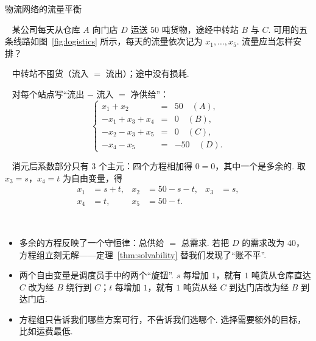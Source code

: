 \documentclass[lang=cn,10.5pt,scheme=chinese,toc=twocol,section,chinesefont=nofont,
twoside,citestyle=gb7714-2015,bibstyle=gb7714-2015]{elegantbook}
\DeclareRobustCommand{\textbf}[1]{{\lnsemiboldlatin\lnsemiboldcjk #1}}
\numberwithin{equation}{section}   %
\newcommand{\mstep}[1]{\par\smallskip\noindent\textbf{【#1】}\ }
\begin{document}
\begin{modelbox}{物流网络的流量平衡}
  \mstep{问题} 某公司每天从仓库 $A$ 向门店 $D$ 运送 $50$ 吨货物，途经中转站 $B$ 与 $C$. 可用的五条线路如图~\ref{fig:logistics} 所示，每天的流量依次记为 $x_1,\ldots,x_5$. 流量应当怎样安排？
  \begin{center}
    \label{fig:logistics}
  \end{center}
  \mstep{假设} 中转站不囤货（流入 $=$ 流出）；途中没有损耗.

  \mstep{模型} 对每个站点写“流出 $-$ 流入 $=$ 净供给”：
  \begin{equation}
    \label{eq:logistics}
    \left\{
           \begin{array}{rcl}
             x_1+x_2      & = & 50 \quad (A),  \\
             -x_1+x_3+x_4 & = & 0 \quad (B),   \\
             -x_2-x_3+x_5 & = & 0 \quad (C),   \\
             -x_4-x_5     & = & -50 \quad (D).
           \end{array}
    \right.
  \end{equation}

  \mstep{求解} 消元后系数部分只有 $3$ 个主元：四个方程相加得 $0=0$，其中一个是多余的. 取 $x_3=s$，$x_4=t$ 为自由变量，得
  \[
    \begin{aligned}
      x_1 & =s+t, & x_2 & =50-s-t, & x_3 & =s, \\
      x_4 & =t,   & x_5 & =50-t.
    \end{aligned}
  \]

  \mstep{解读}
  \begin{itemize}
    \item 多余的方程反映了一个守恒律：\textbf{总供给 $=$ 总需求}. 若把 $D$ 的需求改为 $40$，方程组立刻无解——定理~\ref{thm:solvability} 替我们发现了“账不平”.
    \item 两个自由变量是调度员手中的两个“旋钮”. $s$ 每增加 $1$，就有 $1$ 吨货从仓库直达 $C$ 改为经 $B$ 绕行到 $C$；$t$ 每增加 $1$，就有 $1$ 吨货从经 $C$ 到达门店改为经 $B$ 到达门店.
    \item 方程组只告诉我们\textbf{哪些方案可行}，不告诉我们\textbf{选哪个}. 选择需要额外的目标，比如运费最低.
  \end{itemize}


\end{modelbox}
\end{document}
